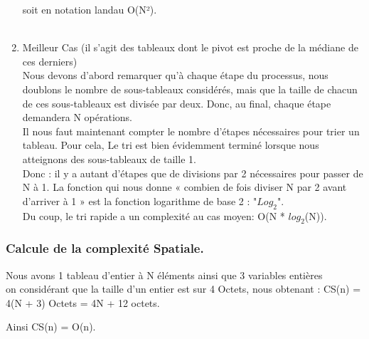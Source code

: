 \documentclass[12pt]{article}
\begin{document}
\begin{enumerate}
	soit en notation landau
	\color{blue} O(N²).
	\color{black}\\
	\texttt{  }\\
	
	
	\item Meilleur Cas
	(il s'agit des tableaux dont le pivot est proche de la médiane de ces derniers)\\
	
	Nous devons d'abord remarquer qu'à chaque étape du processus, nous doublons le nombre de sous-tableaux considérés, 
	mais que la taille de chacun de ces sous-tableaux est divisée par deux. Donc, au final, chaque étape demandera N opérations.\\
	

	Il nous faut maintenant compter le nombre d'étapes nécessaires pour trier un tableau.
	Pour cela, Le tri est bien évidemment terminé lorsque nous atteignons des sous-tableaux de taille 1. \\
	
	Donc : il y a autant d'étapes que de divisions par 2 nécessaires pour passer de N à 1. 
	La fonction qui nous donne \color{blue} « combien de fois diviser N par 2 avant d'arriver à 1 » \color{black} est la fonction logarithme de base 2 : \color{blue} "$Log_{2}$". \color{black} \\
	

	Du coup, le tri rapide a un complexité au cas moyen:\color{blue} O(N * $log_{2}$(N)). \color{black}
\end{enumerate}

\subsubsection{Calcule de la complexité Spatiale.}
Nous avons 1 tableau d'entier à N éléments ainsi que 3 variables entières \\

	on considérant que la taille d'un entier est sur 4 Octets, 
	nous obtenant : \color{blue} CS(n) = 4(N + 3) Octets = 4N + 12 octets.\color{black}
	
	Ainsi \color{blue} CS(n) = O(n). \color{black}
\end{document}
